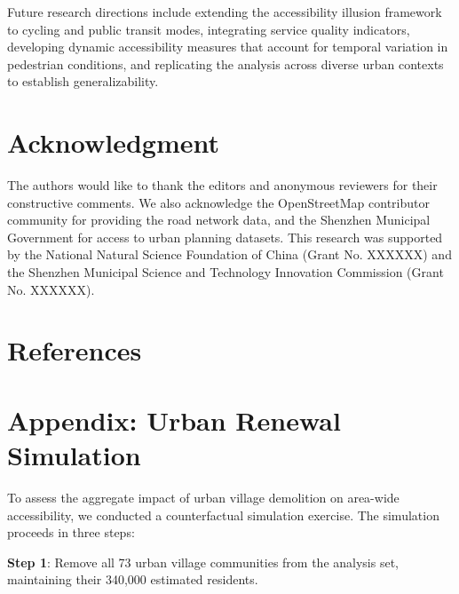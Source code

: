 \documentclass[10pt,conference,compsoc]{IEEEtran}
\begin{document}
\begin{table}[htbp]
\begin{center}
Future research directions include extending the accessibility illusion framework to cycling and public transit modes, integrating service quality indicators, developing dynamic accessibility measures that account for temporal variation in pedestrian conditions, and replicating the analysis across diverse urban contexts to establish generalizability.

\section*{Acknowledgment}
\label{sec:acknowledgment}

The authors would like to thank the editors and anonymous reviewers for their constructive comments. We also acknowledge the OpenStreetMap contributor community for providing the road network data, and the Shenzhen Municipal Government for access to urban planning datasets. This research was supported by the National Natural Science Foundation of China (Grant No. XXXXXX) and the Shenzhen Municipal Science and Technology Innovation Commission (Grant No. XXXXXX).

\section*{References}
\label{sec:references}




\appendices
\section{Appendix: Urban Renewal Simulation}
\label{appendix:simulation}

To assess the aggregate impact of urban village demolition on area-wide accessibility, we conducted a counterfactual simulation exercise. The simulation proceeds in three steps:

\textbf{Step 1}: Remove all 73 urban village communities from the analysis set, maintaining their 340{,}000 estimated residents.


\end{center}
\end{table}
\end{document}
